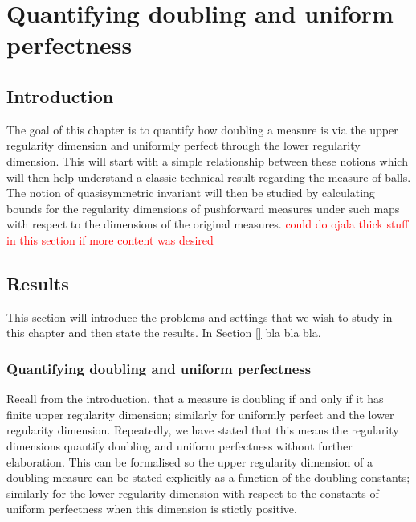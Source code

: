 \chapter{Quantifying doubling and uniform perfectness}
\label{chap:quantifying}


\section{Introduction}
\label{sec:intro-quantifying}


The goal of this chapter is to quantify how doubling a measure is via the upper regularity dimension and uniformly perfect through the lower regularity dimension. This will start with a simple relationship between these notions which will then help understand a classic technical result regarding the measure of balls. The notion of quasisymmetric invariant will then be studied by calculating bounds for the regularity dimensions of pushforward measures under such maps with respect to the dimensions of the original measures.
\textcolor{red}{could do ojala thick stuff in this section if more content was desired}





\section{Results}\label{ch-quantifying:sec:results}

This section will introduce the problems and settings that we wish to study in this chapter and then state the results. In Section \ref{} bla bla bla.


\subsection{Quantifying doubling and uniform perfectness}\label{ch-quantifying:sec:equivalence}

Recall from the introduction, that a measure is doubling if and only if it has finite upper regularity dimension; similarly for uniformly perfect and the lower regularity dimension. Repeatedly, we have stated that this means the regularity dimensions quantify doubling and uniform perfectness without further elaboration. This can be formalised so the upper regularity dimension of a doubling measure can be stated explicitly as a function of the doubling constants; similarly for the lower regularity dimension with respect to the constants of uniform perfectness when this dimension is stictly positive. 

